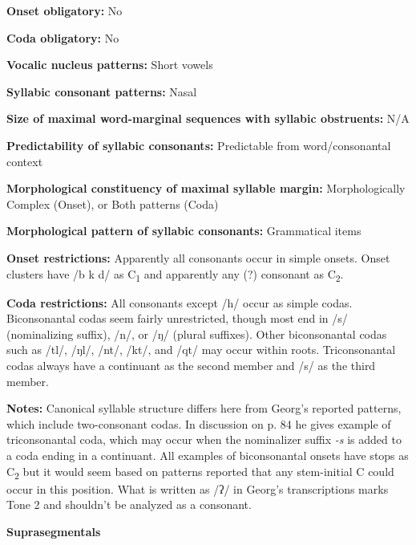 \textbf{Onset obligatory:} No



\textbf{Coda obligatory:} No



\textbf{Vocalic nucleus patterns:} Short vowels



\textbf{Syllabic consonant patterns:} Nasal



\textbf{Size of maximal word{}-marginal sequences with syllabic obstruents:} N/A



\textbf{Predictability of syllabic consonants:} Predictable from word/consonantal context



\textbf{Morphological constituency of maximal syllable margin:} Morphologically Complex (Onset), or Both patterns (Coda)



\textbf{Morphological pattern of syllabic consonants:} Grammatical items



\textbf{Onset restrictions:} Apparently all consonants occur in simple onsets. Onset clusters have /b k d/ as C\textsubscript{1} and apparently any (?) consonant as C\textsubscript{2}.



\textbf{Coda restrictions:} All consonants except /h/ occur as simple codas. Biconsonantal codas seem fairly unrestricted, though most end in /s/ (nominalizing suffix), /n/, or /ŋ/ (plural suffixes). Other biconsonantal codas such as /tl/, /ŋl/, /nt/, /kt/, and /qt/ may occur within roots. Triconsonantal codas always have a continuant as the second member and /s/ as the third member.



\textbf{Notes:} Canonical syllable structure differs here from Georg’s reported patterns, which include two-consonant codas. In discussion on p. 84 he gives example of triconsonantal coda, which may occur when the nominalizer suffix \textit{{}-s} is added to a coda ending in a continuant. All examples of biconsonantal onsets have stops as C\textsubscript{2} but it would seem based on patterns reported that any stem-initial C could occur in this position. What is written as /ʔ/ in Georg’s transcriptions marks Tone 2 and shouldn’t be analyzed as a consonant.



\textbf{Suprasegmentals}



